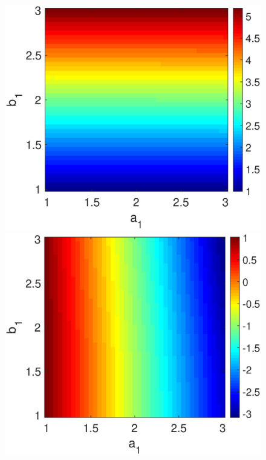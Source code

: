 \begin{figure}[h]
  \begin{minipage}{0.32\linewidth}
  \begin{center}
\includegraphics[width=1\linewidth]{Images/photo26_1.eps}
\end{center}
  \end{minipage} 
  \begin{minipage}{0.32\linewidth}
  \begin{center}
\includegraphics[width=1\linewidth]{Images/photo26_2.eps}

\end{center}
\end{minipage}
\end{figure}
